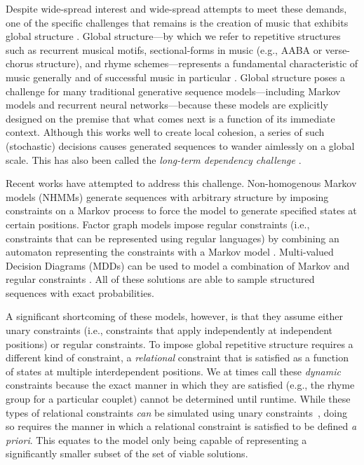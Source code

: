 \documentclass[phd,electronic,oneside,twosidetoc,letterpaper,chaptercenter,parttop,lof,lot]{byumsphd}
\begin{document}
Despite wide-spread interest and wide-spread attempts to meet these demands, one of the specific challenges that remains is the creation of music that exhibits global structure \cite{Jaques2016,roy2016enforcing}. Global structure---by which we refer to repetitive structures such as recurrent musical motifs, sectional-forms in music (e.g., AABA or verse-chorus structure), and rhyme schemes---represents a fundamental characteristic of music generally and of successful music in particular \cite{Nunes2014}. Global structure poses a challenge for many traditional generative sequence models---including Markov models and recurrent neural networks---because these models are explicitly designed on the premise that what comes next is a function of its immediate context. Although this works well to create local cohesion, a series of such (stochastic) decisions causes generated sequences to wander aimlessly on a global scale. This has also been called the \emph{long-term dependency challenge} \cite{collins2017computer}.

Recent works have attempted to address this challenge. Non-homogenous Markov models (NHMMs) \cite{pachet2011finite} generate sequences with arbitrary structure by imposing constraints on a Markov process to force the model to generate specified states at certain positions. Factor graph models impose regular constraints (i.e., constraints that can be represented using regular languages) by combining an automaton representing the constraints with a Markov model \cite{papadopoulos2015exact}. Multi-valued Decision Diagrams (MDDs) can be used to model a combination of Markov and regular constraints \cite{perez2017mdds}. All of these solutions are able to sample structured sequences with exact probabilities.

A significant shortcoming of these models, however, is that they assume either unary constraints (i.e., constraints that apply independently at independent positions) or regular constraints. To impose global repetitive structure requires a different kind of constraint, a \emph{relational} constraint that is satisfied as a function of states at multiple interdependent positions. We at times call these \emph{dynamic} constraints because the exact manner in which they are satisfied (e.g., the rhyme group for a particular couplet) cannot be determined until runtime. While these types of relational constraints \emph{can} be simulated using unary constraints~\cite{barbieri2012markov}, doing so requires the manner in which a relational constraint is satisfied to be defined \emph{a priori}. This equates to the model only being capable of representing a significantly smaller subset of the set of viable solutions. 
\end{document}

